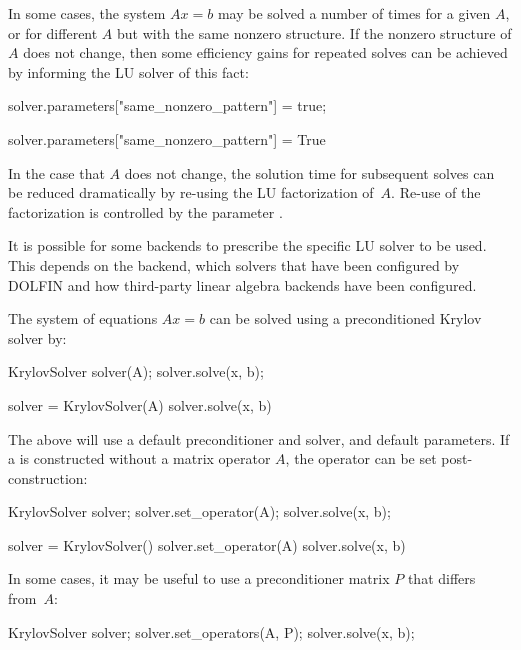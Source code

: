 In some cases, the system $Ax = b$ may be solved a number of times for
a given $A$, or for different $A$ but with the same nonzero structure.
If the nonzero structure of $A$ does not change, then some efficiency
gains for repeated solves can be achieved by informing the LU solver
of this fact:

\begin{c++}
solver.parameters["same_nonzero_pattern"] = true;
\end{c++}

\begin{python}
solver.parameters["same_nonzero_pattern"] = True
\end{python}
In the case that $A$ does not change, the solution time for subsequent
solves can be reduced dramatically by re-using the LU factorization
of~$A$.  Re-use of the factorization is controlled by the parameter
.

It is possible for some backends to prescribe the specific LU solver
to be used. This depends on the backend, which solvers that have been
configured by DOLFIN and how third-party linear algebra backends have
been configured.

The system of equations $Ax = b$ can be solved using a preconditioned
Krylov solver by:

\begin{c++}
KrylovSolver solver(A);
solver.solve(x, b);
\end{c++}

\begin{python}
solver = KrylovSolver(A)
solver.solve(x, b)
\end{python}
The above will use a default preconditioner and solver, and default
parameters. If a  is constructed without a matrix
operator $A$, the operator can be set post-construction:

\begin{c++}
KrylovSolver solver;
solver.set_operator(A);
solver.solve(x, b);
\end{c++}

\begin{python}
solver = KrylovSolver()
solver.set_operator(A)
solver.solve(x, b)
\end{python}
In some cases, it may be useful to use a preconditioner matrix $P$ that
differs from~$A$:

\begin{c++}
KrylovSolver solver;
solver.set_operators(A, P);
solver.solve(x, b);
\end{c++}

